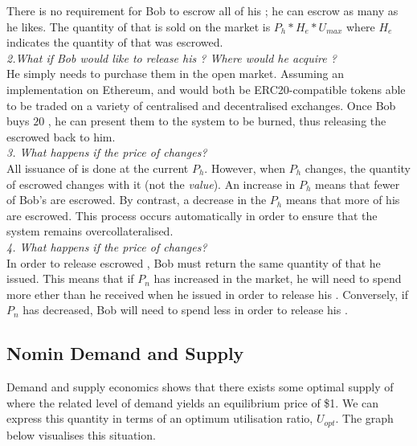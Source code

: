 \noindent There is no requirement for Bob to escrow all of his \HAV{}; he can escrow as many as he likes. The quantity of \NOM{} that is sold on the market is $ P_h * H_e * U_{max} $ where $H_e$ indicates the quantity of \HAV{} that was escrowed. \\

\noindent \emph{2.What if Bob would like to release his \HAV{}? Where would he acquire \NOM{}?} \\ 

\noindent He simply needs to purchase them in the open market. Assuming an implementation on Ethereum, \HAV{} and \NOM{} would both be ERC20-compatible tokens able to be traded on a variety of centralised and decentralised exchanges. Once Bob buys $20$ \NOM{}, he can present them to the system to be burned, thus releasing the escrowed \HAV{} back to him. \\ 

\noindent \emph{3. What happens if the price of \HAV{} changes?} \\

\noindent All issuance of \NOM{} is done at the current $P_h$. However, when $P_h$ changes, the quantity of escrowed \HAV{} changes with it (not the \emph{value}). An increase in $P_h$ means that fewer of Bob's \HAV{} are escrowed. By contrast, a decrease in the $P_h$ means that more of his \HAV{} are escrowed. This process occurs automatically in order to ensure that the system remains overcollateralised. \\ 

\noindent \emph{4. What happens if the price of \NOM{} changes?} \\ 

\noindent In order to release escrowed \HAV{}, Bob must return the same quantity of \NOM{} that he issued. This means that if $P_n$ has increased in the market, he will need to spend more ether than he received when he issued in order to release his \HAV{}. Conversely, if $P_n$ has decreased, Bob will need to spend less in order to release his \HAV{}.

\newpage

\subsection{Nomin Demand and Supply} 

\noindent Demand and supply economics shows that there exists some optimal supply of \NOM{} where the related level of demand yields an equilibrium price of \$1. We can express this quantity in terms of an optimum utilisation ratio, $U_{opt}$. The graph below visualises this situation. \\

